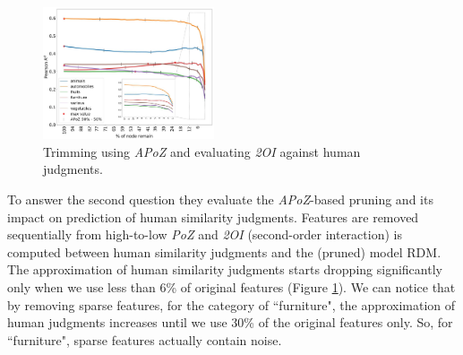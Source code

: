 \begin{figure}
  \centering
  \includegraphics[width=0.45\textwidth]{images/apoz_4.png}
  \caption{Trimming using \textit{APoZ} and evaluating \textit{2OI} against human judgments.}
  \label{fig:apoz_4}
\end{figure}

To answer the second question they evaluate the \textit{APoZ}-based pruning and its impact on prediction of human similarity judgments. Features are removed sequentially from high-to-low \textit{PoZ} and \textit{2OI} (second-order interaction) is computed between human similarity judgments and the (pruned) model RDM.
The approximation of human similarity judgments starts dropping significantly only when we use less than 6\% of original features (Figure \ref{fig:apoz_4}).
We can notice that by removing sparse features, for the category of ``furniture", the approximation of human judgments increases until we use 30\% of the original features only. So, for ``furniture", sparse features actually contain noise.

